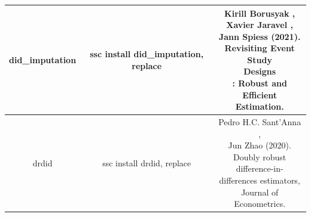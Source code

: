 \documentclass[cn,12pt,math=newtx,citestyle=gb7714-2015,bibstyle=gb7714-2015]{elegantbook}
\makeatletter
\newcommand{\tabincell}[2]{\begin{tabular}{@{}#1@{}}#2\end{tabular}}  %
\makeatother
\begin{document}
\begin{table}[htbp]
\begin{longtable}{|c|c|c|}
			\hline
			did\_imputation&	ssc install did\_imputation, replace& \tabincell{c}{Kirill Borusyak , \\Xavier Jaravel , \\Jann Spiess  (2021). \\Revisiting Event Study \\Designs\\: Robust and Efficient \\Estimation.} \\
			\hline
			
			drdid &	ssc install drdid, replace& \tabincell{c}{ Pedro H.C. Sant'Anna ,\\ Jun Zhao (2020).\\ Doubly robust\\ difference-in-\\differences estimators, \\Journal of Econometrics.}\\
			\hline
			
			
		\end{longtable}
	\end{table}
	
\end{document}
